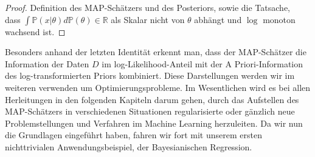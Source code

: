 \documentclass{report}
\theoremstyle{linebreak}
\begin{document}
\begin{proof}
Definition des MAP-Schätzers und des Posteriors, sowie die Tatsache, \\ dass $\int  \mathbb{P}(x\vert \theta) d\mathbb{P}(\theta) \in \mathbb{R}$ als Skalar nicht von $\theta$ abhängt und $\log$ monoton wachsend ist.
\end{proof}

Besonders anhand der letzten Identität erkennt man, dass der MAP-Schätzer die Information der Daten $D$ im log-Likelihood-Anteil mit der A Priori-Information des log-transformierten Priors kombiniert. Diese Darstellungen werden wir im weiteren verwenden um Optimierungsprobleme. Im Wesentlichen wird es bei allen Herleitungen in den folgenden Kapiteln darum gehen, durch das Aufstellen des MAP-Schätzers in verschiedenen Situationen regularisierte oder gänzlich neue Problemstellungen und Verfahren im Machine Learning herzuleiten. Da wir nun die Grundlagen eingeführt haben, fahren wir fort mit unserem ersten nichttrivialen Anwendungsbeispiel, der Bayesianischen Regression.




\nocite{*}


\end{document}
